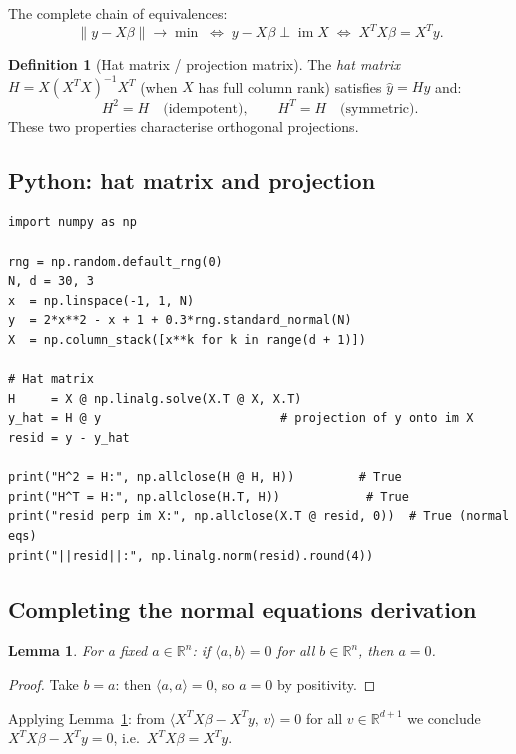 \documentclass[11pt]{article}
\theoremstyle{definition}
\newtheorem{definition}{Definition}[section]
\theoremstyle{plain}
\newtheorem{lemma}{Lemma}[section]
\begin{document}
\medskip\noindent
The complete chain of equivalences:
\[
  \|y - X\beta\| \to \min
  \;\Longleftrightarrow\;
  y - X\beta \perp \operatorname{im}X
  \;\Longleftrightarrow\;
  X^TX\beta = X^Ty.
\]

\begin{definition}[Hat matrix / projection matrix]
  The \emph{hat matrix}
  $H = X(X^TX)^{-1}X^T$ (when $X$ has full column rank) satisfies
  $\hat{y} = Hy$ and:
  \[
    H^2 = H \quad\text{(idempotent)}, \qquad H^T = H \quad\text{(symmetric)}.
  \]
  These two properties characterise orthogonal projections.
\end{definition}

\subsection{Python: hat matrix and projection}
\begin{lstlisting}
import numpy as np

rng = np.random.default_rng(0)
N, d = 30, 3
x  = np.linspace(-1, 1, N)
y  = 2*x**2 - x + 1 + 0.3*rng.standard_normal(N)
X  = np.column_stack([x**k for k in range(d + 1)])

# Hat matrix
H     = X @ np.linalg.solve(X.T @ X, X.T)
y_hat = H @ y                         # projection of y onto im X
resid = y - y_hat

print("H^2 = H:", np.allclose(H @ H, H))         # True
print("H^T = H:", np.allclose(H.T, H))            # True
print("resid perp im X:", np.allclose(X.T @ resid, 0))  # True (normal eqs)
print("||resid||:", np.linalg.norm(resid).round(4))
\end{lstlisting}

\subsection{Completing the normal equations derivation}

\begin{lemma}\label{lem:zero-inner}
  For a fixed $a \in \mathbb{R}^n$: if $\langle a, b\rangle = 0$ for all
  $b \in \mathbb{R}^n$, then $a = 0$.
\end{lemma}
\begin{proof}
  Take $b = a$: then $\langle a, a\rangle = 0$, so $a = 0$ by positivity.
\end{proof}

\noindent
Applying Lemma~\ref{lem:zero-inner}: from
$\langle X^TX\beta - X^Ty,\, v\rangle = 0$ for all $v \in \mathbb{R}^{d+1}$
we conclude $X^TX\beta - X^Ty = 0$, i.e.\ $X^TX\beta = X^Ty$.
\end{document}

